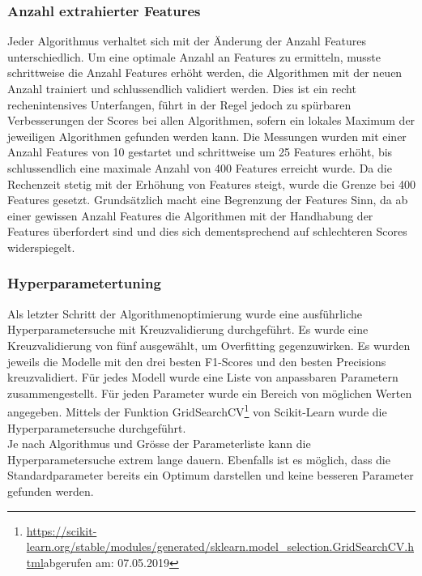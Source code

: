 \subsubsection{Anzahl extrahierter Features}
Jeder Algorithmus verhaltet sich mit der Änderung der Anzahl Features unterschiedlich.
Um eine optimale Anzahl an Features zu ermitteln, musste schrittweise die Anzahl Features erhöht werden, die Algorithmen mit der neuen Anzahl trainiert und schlussendlich validiert werden.
Dies ist ein recht rechenintensives Unterfangen, führt in der Regel jedoch zu spürbaren Verbesserungen der Scores bei allen Algorithmen, sofern ein lokales Maximum der jeweiligen Algorithmen gefunden werden kann.
Die Messungen wurden mit einer Anzahl Features von 10 gestartet und schrittweise um 25 Features erhöht, bis schlussendlich eine maximale Anzahl von 400 Features erreicht wurde.
Da die Rechenzeit stetig mit der Erhöhung von Features steigt, wurde die Grenze bei 400 Features gesetzt.
Grundsätzlich macht eine Begrenzung der Features Sinn, da ab einer gewissen Anzahl Features die Algorithmen mit der Handhabung der Features überfordert sind und dies sich dementsprechend auf schlechteren Scores widerspiegelt.
\subsubsection{Hyperparametertuning}
Als letzter Schritt der Algorithmenoptimierung wurde eine ausführliche Hyperparametersuche mit Kreuzvalidierung durchgeführt.
Es wurde eine Kreuzvalidierung von fünf ausgewählt, um Overfitting gegenzuwirken.
Es wurden jeweils die Modelle mit den drei besten F1-Scores und den besten Precisions kreuzvalidiert.
Für jedes Modell wurde eine Liste von anpassbaren Parametern zusammengestellt.
Für jeden Parameter wurde ein Bereich von möglichen Werten angegeben.
Mittels der Funktion \glqq GridSearchCV\grqq{}\footnote{\url{https://scikit-learn.org/stable/modules/generated/sklearn.model_selection.GridSearchCV.html}abgerufen am: 07.05.2019} von Scikit-Learn wurde die Hyperparametersuche durchgeführt.\\
Je nach Algorithmus und Grösse der Parameterliste kann die Hyperparametersuche extrem lange dauern.
Ebenfalls ist es möglich, dass die Standardparameter bereits ein Optimum darstellen und keine besseren Parameter gefunden werden.
